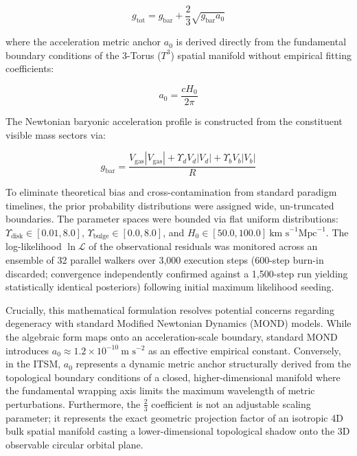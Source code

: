 \documentclass[aps,prd,10pt,twocolumn,superscriptaddress,nofootinbib,floatfix]{revtex4-2}
\begin{document}
\begin{equation}
g_{\text{tot}} = g_{\text{bar}} + \frac{2}{3}\sqrt{g_{\text{bar}} a_0}
\end{equation}

where the acceleration metric anchor $a_0$ is derived directly from the fundamental boundary conditions of the 3-Torus ($T^3$) spatial manifold without empirical fitting coefficients:

\begin{equation}
a_0 = \frac{c H_0}{2\pi}
\end{equation}

The Newtonian baryonic acceleration profile is constructed from the constituent visible mass sectors via:

\begin{equation}
g_{\text{bar}} = \frac{V_{\text{gas}}|V_{\text{gas}}| + \Upsilon_{d} V_{d}|V_{d}| + \Upsilon_{b} V_{b}|V_{b}|}{R}
\end{equation}

To eliminate theoretical bias and cross-contamination from standard paradigm timelines, the prior probability distributions were assigned wide, un-truncated boundaries. The parameter spaces were bounded via flat uniform distributions: $\Upsilon_{\text{disk}} \in [0.01, 8.0]$, $\Upsilon_{\text{bulge}} \in [0.0, 8.0]$, and $H_0 \in [50.0, 100.0] \ \text{km s}^{-1} \text{Mpc}^{-1}$. The log-likelihood $\ln \mathcal{L}$ of the observational residuals was monitored across an ensemble of 32 parallel walkers over 3,000 execution steps (600-step burn-in discarded; convergence independently confirmed against a 1,500-step run yielding statistically identical posteriors) following initial maximum likelihood seeding.

Crucially, this mathematical formulation resolves potential concerns regarding degeneracy with standard Modified Newtonian Dynamics (MOND) models. While the algebraic form maps onto an acceleration-scale boundary, standard MOND introduces $a_0 \approx 1.2 \times 10^{-10} \ \text{m s}^{-2}$ as an effective empirical constant. Conversely, in the ITSM, $a_0$ represents a dynamic metric anchor structurally derived from the topological boundary conditions of a closed, higher-dimensional manifold where the fundamental wrapping axis limits the maximum wavelength of metric perturbations. Furthermore, the $\frac{2}{3}$ coefficient is not an adjustable scaling parameter; it represents the exact geometric projection factor of an isotropic 4D bulk spatial manifold casting a lower-dimensional topological shadow onto the 3D observable circular orbital plane.
\end{document}
